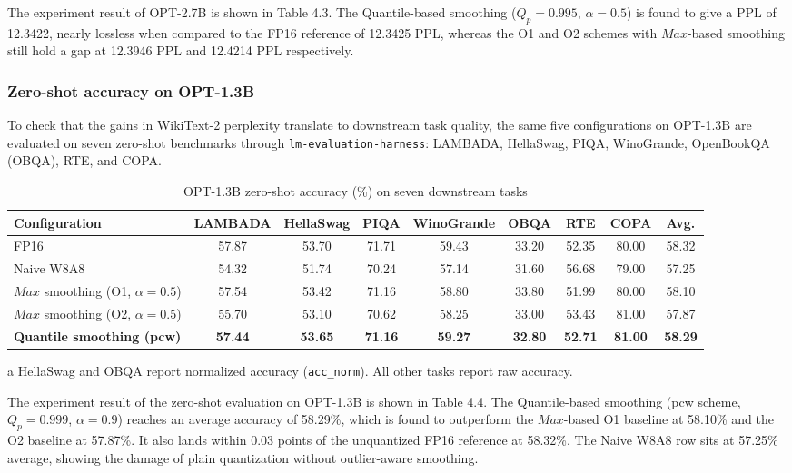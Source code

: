 The experiment result of OPT-2.7B is shown in Table 4.3. The Quantile-based smoothing ($Q_p=0.995$, $\alpha=0.5$) is found to give a PPL of 12.3422, nearly lossless when compared to the FP16 reference of 12.3425 PPL, whereas the O1 and O2 schemes with $Max$-based smoothing still hold a gap at 12.3946 PPL and 12.4214 PPL respectively.

\subsubsection*{Zero-shot accuracy on OPT-1.3B}

To check that the gains in WikiText-2 perplexity translate to downstream task quality, the same five configurations on OPT-1.3B are evaluated on seven zero-shot benchmarks through \texttt{lm-evaluation-harness}: LAMBADA, HellaSwag, PIQA, WinoGrande, OpenBookQA (OBQA), RTE, and COPA.

\begin{table}[h]
\centering
\begin{threeparttable}
\caption{OPT-1.3B zero-shot accuracy (\%) on seven downstream tasks}
\small
\begin{tabular}{lcccccccc}
\hline
Configuration & LAMBADA & HellaSwag\tnote{a} & PIQA & WinoGrande & OBQA\tnote{a} & RTE & COPA & Avg. \\
\hline
FP16 & 57.87 & 53.70 & 71.71 & 59.43 & 33.20 & 52.35 & 80.00 & 58.32 \\
Naive W8A8 & 54.32 & 51.74 & 70.24 & 57.14 & 31.60 & 56.68 & 79.00 & 57.25 \\
$Max$ smoothing (O1, $\alpha=0.5$) & 57.54 & 53.42 & 71.16 & 58.80 & 33.80 & 51.99 & 80.00 & 58.10 \\
$Max$ smoothing (O2, $\alpha=0.5$) & 55.70 & 53.10 & 70.62 & 58.25 & 33.00 & 53.43 & 81.00 & 57.87 \\
\textbf{Quantile smoothing (pcw)} & \textbf{57.44} & \textbf{53.65} & \textbf{71.16} & \textbf{59.27} & \textbf{32.80} & \textbf{52.71} & \textbf{81.00} & \textbf{58.29} \\
\hline
\end{tabular}
\begin{tablenotes}
\item[a] HellaSwag and OBQA report normalized accuracy (\texttt{acc\_norm}). All other tasks report raw accuracy.
\end{tablenotes}
\end{threeparttable}
\end{table}

The experiment result of the zero-shot evaluation on OPT-1.3B is shown in Table 4.4. The Quantile-based smoothing (pcw scheme, $Q_p=0.999$, $\alpha=0.9$) reaches an average accuracy of 58.29\%, which is found to outperform the $Max$-based O1 baseline at 58.10\% and the O2 baseline at 57.87\%. It also lands within 0.03 points of the unquantized FP16 reference at 58.32\%. The Naive W8A8 row sits at 57.25\% average, showing the damage of plain quantization without outlier-aware smoothing.

